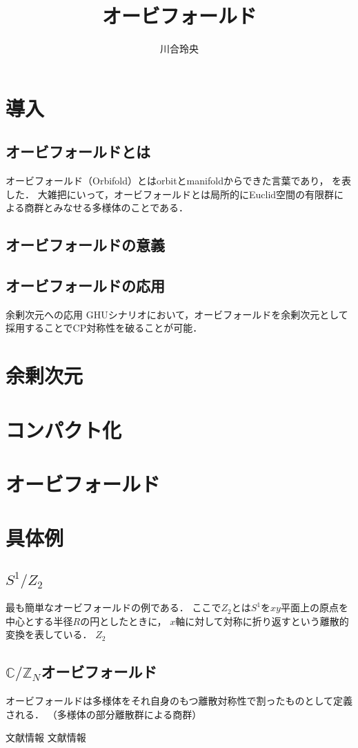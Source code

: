 \documentclass[uplatex]{jsarticle}
\numberwithin{theorem}{section}
\begin{document}
\title{オービフォールド}
\author{川合玲央}

\maketitle

\tableofcontents

\section{導入}

\subsection{オービフォールドとは}
オービフォールド（Orbifold）とはorbitとmanifoldからできた言葉であり，
を表した．
大雑把にいって，オービフォールドとは局所的にEuclid空間の有限群による商群とみなせる多様体のことである．

\subsection{オービフォールドの意義}

\subsection{オービフォールドの応用}
余剰次元への応用
GHUシナリオにおいて，オービフォールドを余剰次元として採用することでCP対称性を破ることが可能．


\section{余剰次元}


\section{コンパクト化}

\section{オービフォールド}

\section{具体例}

\subsection{\texorpdfstring{$S^1/Z_2$}{S1/Z2}}
最も簡単なオービフォールドの例である．
ここで$Z_2$とは$S^1$を$xy$平面上の原点を中心とする半径$R$の円としたときに，
$x$軸に対して対称に折り返すという離散的変換を表している．
$Z_2$

\subsection{\texorpdfstring{$\mathbb{C}/\mathbb{Z}_N$オービフォールド}{C/ZNオービフォールド}}

オービフォールドは多様体をそれ自身のもつ離散対称性で割ったものとして定義される．
（多様体の部分離散群による商群）



\begin{thebibliography}{99}
 文献情報
 文献情報
\end{thebibliography}
\end{document}
